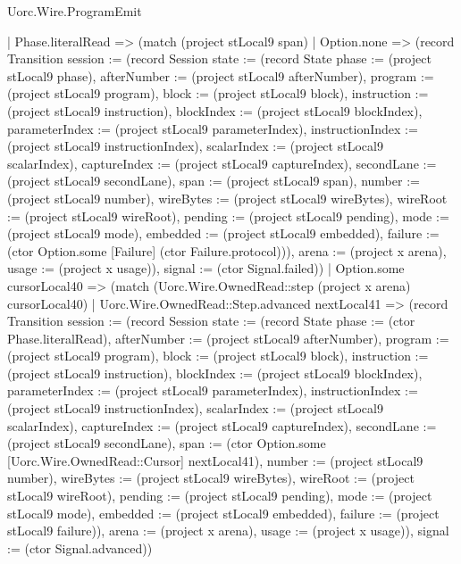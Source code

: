 \begin{lexlean}{Uorc.Wire.ProgramEmit}
\begin{semanticmodule}
{        | Phase.literalRead => (match (project stLocal9 span)
          | Option.none => (record Transition {session := (record Session {state := (record State {phase := (project stLocal9 phase), afterNumber := (project stLocal9 afterNumber), program := (project stLocal9 program), block := (project stLocal9 block), instruction := (project stLocal9 instruction), blockIndex := (project stLocal9 blockIndex), parameterIndex := (project stLocal9 parameterIndex), instructionIndex := (project stLocal9 instructionIndex), scalarIndex := (project stLocal9 scalarIndex), captureIndex := (project stLocal9 captureIndex), secondLane := (project stLocal9 secondLane), span := (project stLocal9 span), number := (project stLocal9 number), wireBytes := (project stLocal9 wireBytes), wireRoot := (project stLocal9 wireRoot), pending := (project stLocal9 pending), mode := (project stLocal9 mode), embedded := (project stLocal9 embedded), failure := (ctor Option.some [Failure] (ctor Failure.protocol))}), arena := (project x arena), usage := (project x usage)}), signal := (ctor Signal.failed)})
          | Option.some cursorLocal40 => (match (Uorc.Wire.OwnedRead::step (project x arena) cursorLocal40)
            | Uorc.Wire.OwnedRead::Step.advanced nextLocal41 => (record Transition {session := (record Session {state := (record State {phase := (ctor Phase.literalRead), afterNumber := (project stLocal9 afterNumber), program := (project stLocal9 program), block := (project stLocal9 block), instruction := (project stLocal9 instruction), blockIndex := (project stLocal9 blockIndex), parameterIndex := (project stLocal9 parameterIndex), instructionIndex := (project stLocal9 instructionIndex), scalarIndex := (project stLocal9 scalarIndex), captureIndex := (project stLocal9 captureIndex), secondLane := (project stLocal9 secondLane), span := (ctor Option.some [Uorc.Wire.OwnedRead::Cursor] nextLocal41), number := (project stLocal9 number), wireBytes := (project stLocal9 wireBytes), wireRoot := (project stLocal9 wireRoot), pending := (project stLocal9 pending), mode := (project stLocal9 mode), embedded := (project stLocal9 embedded), failure := (project stLocal9 failure)}), arena := (project x arena), usage := (project x usage)}), signal := (ctor Signal.advanced)})
}
\end{semanticmodule}
\end{lexlean}
